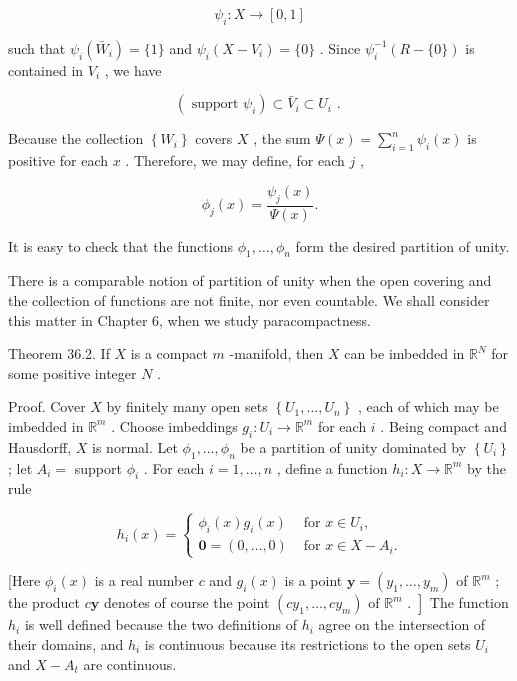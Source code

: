 \documentclass[10pt]{article}
\begin{document}
\[
{\psi }_{i} : X \rightarrow  \left\lbrack  {0,1}\right\rbrack
\]

such that \({\psi }_{i}\left( {\bar{W}}_{i}\right)  = \{ 1\}\) and \({\psi }_{i}\left( {X - {V}_{i}}\right)  = \{ 0\}\) . Since \({\psi }_{i}^{-1}\left( {R-\{ 0\} }\right)\) is contained in \({V}_{i}\) , we have

\[
\left( {\text{ support }{\psi }_{i}}\right)  \subset  {\bar{V}}_{i} \subset  {U}_{i}\text{ . }
\]

Because the collection \(\left\{  {W}_{i}\right\}\) covers \(X\) , the sum \(\Psi \left( x\right)  = \mathop{\sum }\limits_{{i = 1}}^{n}{\psi }_{i}\left( x\right)\) is positive for each \(x\) . Therefore, we may define, for each \(j\) ,

\[
{\phi }_{j}\left( x\right)  = \frac{{\psi }_{j}\left( x\right) }{\Psi \left( x\right) }.
\]

It is easy to check that the functions \({\phi }_{1},\ldots ,{\phi }_{n}\) form the desired partition of unity.

There is a comparable notion of partition of unity when the open covering and the collection of functions are not finite, nor even countable. We shall consider this matter in Chapter 6, when we study paracompactness.

Theorem 36.2. If \(X\) is a compact \(m\) -manifold, then \(X\) can be imbedded in \({\mathbb{R}}^{N}\) for some positive integer \(N\) .

Proof. Cover \(X\) by finitely many open sets \(\left\{  {{U}_{1},\ldots ,{U}_{n}}\right\}\) , each of which may be imbedded in \({\mathbb{R}}^{m}\) . Choose imbeddings \({g}_{i} : {U}_{i} \rightarrow  {\mathbb{R}}^{m}\) for each \(i\) . Being compact and Hausdorff, \(X\) is normal. Let \({\phi }_{1},\ldots ,{\phi }_{n}\) be a partition of unity dominated by \(\left\{  {U}_{i}\right\}\) ; let \({A}_{i} =\) support \({\phi }_{i}\) . For each \(i = 1,\ldots ,n\) , define a function \({h}_{i} : X \rightarrow  {\mathbb{R}}^{m}\) by the rule

\[
{h}_{i}\left( x\right)  = \left\{  \begin{array}{ll} {\phi }_{i}\left( x\right) {g}_{i}\left( x\right) & \text{ for }x \in  {U}_{i}, \\  \mathbf{0} = \left( {0,\ldots ,0}\right) & \text{ for }x \in  X - {A}_{i}. \end{array}\right.
\]

[Here \({\phi }_{i}\left( x\right)\) is a real number \(c\) and \({g}_{i}\left( x\right)\) is a point \(\mathbf{y} = \left( {{y}_{1},\ldots ,{y}_{m}}\right)\) of \({\mathbb{R}}^{m}\) ; the product \(c\mathbf{y}\) denotes of course the point \(\left. {\left( {c{y}_{1},\ldots ,c{y}_{m}}\right) \text{ of }{\mathbb{R}}^{m}\text{ . }}\right\rbrack\) The function \({h}_{i}\) is well defined because the two definitions of \({h}_{i}\) agree on the intersection of their domains, and \({h}_{i}\) is continuous because its restrictions to the open sets \({U}_{i}\) and \(X - {A}_{t}\) are continuous.
\end{document}
